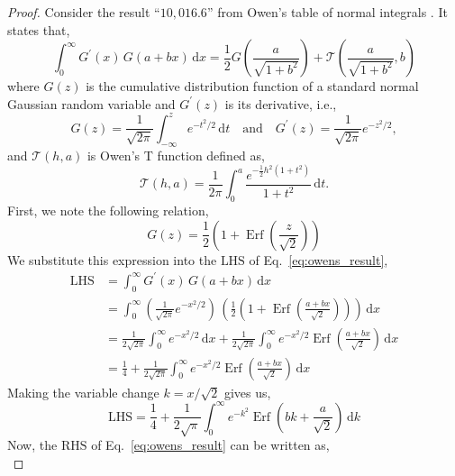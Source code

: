 \documentclass[journal]{IEEEtran}
\theoremstyle{plain}
\theoremstyle{definition}
\theoremstyle{remark}
\newcommand{\Ot}{\mathcal{T}}
\newcommand{\Erf}{\operatorname{Erf}}
\newcommand{\dd}{\mathrm{d}}
\newcommand{\LHS}{\text{LHS}}
\newcommand{\RHS}{\text{RHS}}
\begin{document}
\begin{proof}
Consider the result ``$10,016.6$'' from Owen's table of normal integrals \cite{owen1980table}. It states that,
\begin{equation}
    \int_0^\infty G^\prime(x) \, G(a+bx) \, \dd x = \frac{1}{2} G\left(\frac{a}{\sqrt{1+b^2}}\right) + \Ot\left(\frac{a}{\sqrt{1+b^2}}, b\right) \label{eq:owens_result}
\end{equation}
where $G(z)$ is the cumulative distribution function of a standard normal Gaussian random variable and $G^\prime(z)$ is its derivative, i.e.,
\begin{equation}
    G(z) = \frac{1}{\sqrt{2 \pi}}\int_{-\infty}^z e^{-t^2/2} \, \dd t \quad \text{and} \quad G^\prime(z) = \frac{1}{\sqrt{2 \pi}} e^{-z^2/2},
\end{equation}
and $\Ot(h, a)$ is Owen's T function defined as,
\begin{equation}
    \Ot(h, a) = \frac{1}{2\pi} \int_0^a \frac{e^{-\frac{1}{2}h^2(1+t^2)}}{1+t^2} \, \dd t.
\end{equation}
First, we note the following relation,
\begin{equation}
    G(z) = \frac{1}{2} \left(1 + \Erf\left(\frac{z}{\sqrt{2}}\right)\right)
\end{equation}
We substitute this expression into the $\LHS$ of Eq.~\eqref{eq:owens_result},
\begin{equation}
\begin{split}
    \LHS &= \int_0^\infty G^\prime(x) \, G(a+bx) \, \dd x \\
    &= \int_0^\infty \left(\frac{1}{\sqrt{2 \pi}} e^{-x^2/2}\right) \, \left(\frac{1}{2} \left(1 + \Erf\left(\frac{a+bx}{\sqrt{2}}\right)\right)\right) \, \dd x \\
    &= \frac{1}{2\sqrt{2 \pi}}\int_0^\infty e^{-x^2/2} \, \dd x + \frac{1}{2\sqrt{2 \pi}}\int_0^\infty e^{-x^2/2} \Erf\left(\frac{a+bx}{\sqrt{2}}\right) \, \dd x \\
    &= \frac{1}{4} + \frac{1}{2\sqrt{2 \pi}}\int_0^\infty e^{-x^2/2} \Erf\left(\frac{a+bx}{\sqrt{2}}\right) \, \dd x
\end{split} 
\end{equation}
Making the variable change $k=x/\sqrt{2}$ gives us,
\begin{equation}
    \LHS = \frac{1}{4} + \frac{1}{2\sqrt{\pi}}\int_0^\infty e^{-k^2} \Erf\left(bk + \frac{a}{\sqrt{2}}\right) \, \dd k
\end{equation}
Now, the $\RHS$ of Eq.~\eqref{eq:owens_result} can be written as,
\begin{equation}

\end{equation}
\end{proof}
\end{document}
